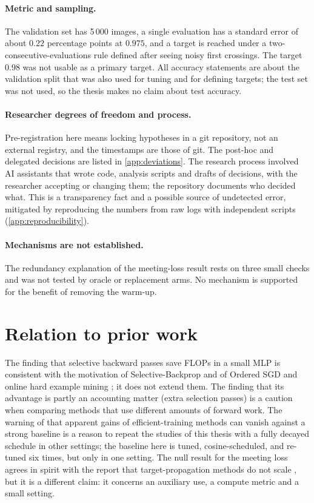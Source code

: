 \paragraph{Metric and sampling.} The validation set has 5\,000 images, a single evaluation has a standard error of about $0.22$ percentage points at $0.975$, and a target is reached under a two-consecutive-evaluations rule defined after seeing noisy first crossings. The target $0.98$ was not usable as a primary target. All accuracy statements are about the validation split that was also used for tuning and for defining targets; the test set was not used, so the thesis makes no claim about test accuracy.

\paragraph{Researcher degrees of freedom and process.} Pre-registration here means locking hypotheses in a git repository, not an external registry, and the timestamps are those of git. The post-hoc and delegated decisions are listed in \cref{app:deviations}. The research process involved AI assistants that wrote code, analysis scripts and drafts of decisions, with the researcher accepting or changing them; the repository documents who decided what. This is a transparency fact and a possible source of undetected error, mitigated by reproducing the numbers from raw logs with independent scripts (\cref{app:reproducibility}).

\paragraph{Mechanisms are not established.} The redundancy explanation of the meeting-loss result rests on three small checks and was not tested by oracle or replacement arms. No mechanism is supported for the benefit of removing the warm-up.

\section{Relation to prior work}
The finding that selective backward passes save FLOPs in a small MLP is consistent with the motivation of Selective-Backprop \citep{jiang2019selective} and of Ordered SGD and online hard example mining \citep{kawaguchi2020ordered,shrivastava2016ohem}; it does not extend them. The finding that its advantage is partly an accounting matter (extra selection passes) is a caution when comparing methods that use different amounts of forward work. The warning of \citet{kaddour2023notrain} that apparent gains of efficient-training methods can vanish against a strong baseline is a reason to repeat the studies of this thesis with a fully decayed schedule in other settings; the baseline here is tuned, cosine-scheduled, and re-tuned six times, but only in one setting. The null result for the meeting loss agrees in spirit with the report that target-propagation methods do not scale \citep{bartunov2018assessing}, but it is a different claim: it concerns an auxiliary use, a compute metric and a small setting.

